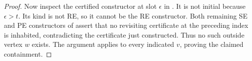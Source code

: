 \begin{proof}
Now inspect the certified constructor at slot \(\epsilon\) in
.  It is not initial because \(\epsilon>t\).
Its kind is not RE, so it cannot be the RE constructor.  Both remaining
SE and PE constructors of  assert that no
revisiting certificate at the preceding index is inhabited, contradicting
the certificate just constructed.  Thus no such outside vertex \(w\)
exists.  The argument applies to every indicated \(v\), proving the
claimed containment.
\end{proof}
